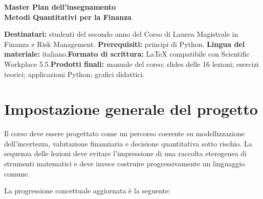 \documentclass[12pt,a4paper]{article}%
\newcommand{\1}{\mathbf{1}}
\begin{document}
\tableofcontents

\begin{center}
{\Large \textbf{Master Plan dell'insegnamento}}\\[6pt]{\large \textbf{Metodi
Quantitativi per la Finanza}}\\[12pt]
\end{center}

\textbf{Destinatari:} studenti del secondo anno del Corso di Laurea Magistrale in Finanza e
Risk Management.\newline
\textbf{Prerequisiti:} principi di Python.\newline
\textbf{Lingua del materiale:}
italiano.\newline\textbf{Formato di scrittura:} LaTeX compatibile con
Scientific Workplace 5.5.\newline\textbf{Prodotti finali:} manuale del corso;
slides delle 16 lezioni; esercizi teorici; applicazioni Python; grafici didattici.

\newpage

\section{Impostazione generale del progetto}

Il corso deve essere progettato come un percorso coerente su modellizzazione
dell'incertezza, valutazione finanziaria e decisione quantitativa sotto
rischio. La sequenza delle lezioni deve evitare l'impressione di una raccolta
eterogenea di strumenti matematici e deve invece costruire progressivamente un
linguaggio comune.

La progressione concettuale aggiornata \`{e} la seguente:
\end{document}
